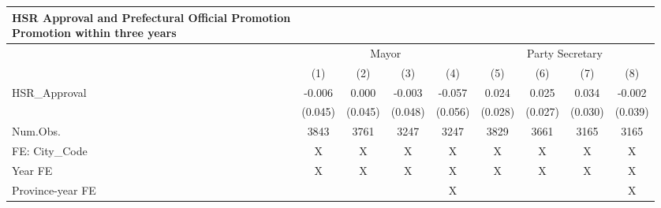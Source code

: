 \begin{longtable}{lcccccccc}
\caption*{
{\large HSR Approval and Prefectural Official Promotion} \\ 
{\small Promotion within three years}
} \\ 
\toprule
 & \multicolumn{4}{c}{Mayor} & \multicolumn{4}{c}{Party Secretary} \\ 
\cmidrule(lr){2-5} \cmidrule(lr){6-9}
  & (1) & (2) & (3) & (4) & (5) & (6) & (7) & (8) \\ 
\midrule
HSR\_Approval & -0.006 & 0.000 & -0.003 & -0.057 & 0.024 & 0.025 & 0.034 & -0.002 \\ 
 & (0.045) & (0.045) & (0.048) & (0.056) & (0.028) & (0.027) & (0.030) & (0.039) \\ 
Num.Obs. & 3843 & 3761 & 3247 & 3247 & 3829 & 3661 & 3165 & 3165 \\ 
FE: City\_Code & X & X & X & X & X & X & X & X \\ 
Year FE & X & X & X & X & X & X & X & X \\ 
Province-year FE &  &  &  & X &  &  &  & X \\ 
\bottomrule
\end{longtable}


